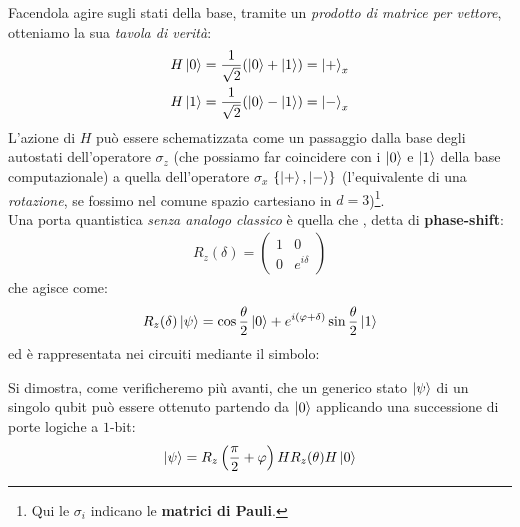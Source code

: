 \documentclass[../../InformazioneQuantistica.tex]{subfiles}
\begin{document}


Facendola agire sugli stati della base, tramite un \textit{prodotto di matrice per vettore}, otteniamo la sua \textit{tavola di verità}:
\begin{align*}
H \Ket{0} &= \frac{1}{\sqrt{2}} (\Ket{0} + \Ket{1}) = \Ket{+}_x\\
H \Ket{1} &= \frac{1}{\sqrt{2}} (\Ket{0} - \Ket{1}) = \Ket{-}_x
\end{align*} 
L'azione di $H$ può essere schematizzata come un passaggio dalla base degli autostati dell'operatore $\sigma_z$ (che possiamo far coincidere con i $\Ket{0}$ e $\Ket{1}$ della base computazionale) a quella dell'operatore $\sigma_x$ $\{\Ket{+},\Ket{-}\}$ (l'equivalente di una \textit{rotazione}, se fossimo nel comune spazio cartesiano in $d=3$)\footnote{Qui le $\sigma_i$ indicano le \textbf{matrici di Pauli}.}.\\

Una porta quantistica \textit{senza analogo classico} è quella che , detta di \textbf{phase-shift}:
\begin{align*}
R_z(\delta) = \begin{pmatrix}
1 & 0\\0 & e^{i\delta}
\end{pmatrix}
\end{align*}
che agisce come:
\begin{align*}
R_z(\delta) \Ket{\psi} = \cos\frac{\theta}{2} \Ket{0} + e^{i(\varphi + \delta)} \sin\frac{\theta}{2} \Ket{1}
\end{align*}
ed è rappresentata nei circuiti mediante il simbolo:



Si dimostra, come verificheremo più avanti, che un generico stato $\Ket{\psi}$ di un singolo qubit può essere ottenuto partendo da $\Ket{0}$ applicando una successione di porte logiche a $1$-bit:
\begin{align*}
\Ket{\psi} = R_z\left(\frac{\pi}{2} + \varphi\right) H R_z(\theta) H \Ket{0}
\end{align*}
\end{document}
